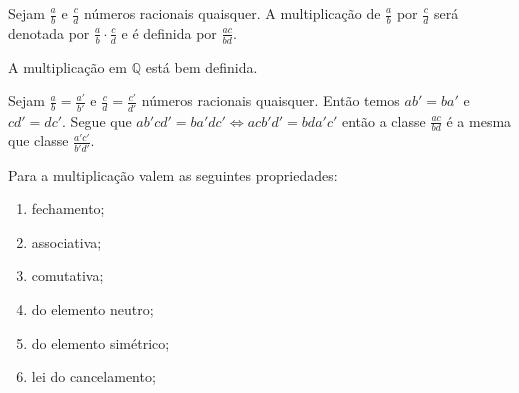 \documentclass[../main.tex]{subfiles}
\begin{document}
\begin{defi}
    Sejam $\frac{a}{b}$ e $\frac{c}{d}$ números racionais quaisquer. A multiplicação de $\frac{a}{b}$ por $\frac{c}{d}$ será denotada por $\frac{a}{b} \cdot \frac{c}{d}$ e é definida por $\frac{ac}{bd}$.
\end{defi}
\begin{prop}
    A multiplicação em $\mathbb{Q}$ está bem definida.
\end{prop}
\begin{dem}
    Sejam $\frac{a}{b} = \frac{a'}{b'}$ e $\frac{c}{d} = \frac{c'}{d'}$ números racionais quaisquer. Então temos $ab' = ba'$ e $cd' = dc'$. Segue que $ab'cd' = ba'dc' \iff acb'd' = bda'c'$ então a classe $\frac{ac}{bd}$ é a mesma que classe $\frac{a'c'}{b'd'}$.
\end{dem}
\begin{prop}{Para a multiplicação valem as seguintes propriedades:}
    \begin{enumerate}[label=(\roman*)]
        \item fechamento;
        \item associativa;
        \item comutativa;
        \item do elemento neutro; 
        \item do elemento simétrico;
        \item lei do cancelamento;
    \end{enumerate}
\end{prop}
\end{document}
